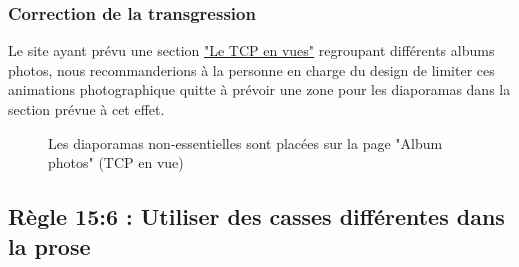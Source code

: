 \documentclass{article}[12pt]
\begin{document}
    	    \subsubsection*{Correction de la transgression}
	    	    Le site ayant prévu une section  \href{http://www.tennisclubdeparis.fr/album-photo.html}{"Le TCP en vues"} regroupant différents albums photos, nous recommanderions à la personne en charge du design de limiter ces animations photographique quitte à prévoir une zone pour les diaporamas dans la section prévue à cet effet.
	    	      \begin{figure}[H]
	    	      	\centering
	    	      	\caption{Les diaporamas non-essentielles sont placées sur la page "Album photos" (TCP en vue)}
	    	      \end{figure}

    \subsection{Règle 15:6 : Utiliser des casses différentes dans la prose}
\end{document}
